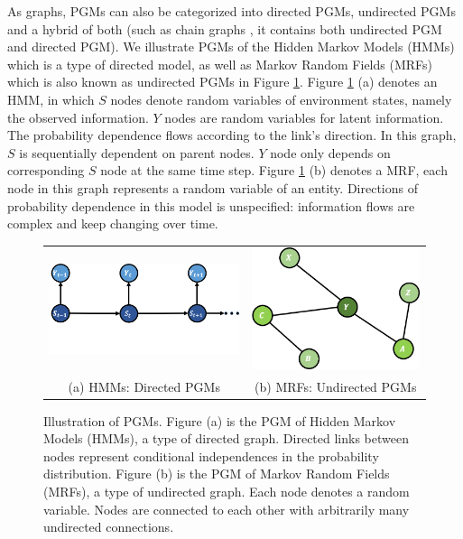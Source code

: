As graphs, PGMs can also be categorized into directed PGMs,
undirected PGMs and a hybrid of both (such as chain graphs
\cite{lauritzen1989graphical,frydenberg1990chain}, it contains
both undirected PGM and directed PGM). We illustrate PGMs of the
Hidden Markov Models \cite{eddy1996hidden} (HMMs) which is a type
of directed model, as well as Markov Random Fields
\cite{Hammersley:1971} (MRFs) which is also known as undirected
PGMs \cite{bishop:2006:PRML} in Figure \ref{fig:intro_hmm_mrf}.
Figure \ref{fig:intro_hmm_mrf} (a) denotes an HMM, in which $S$
nodes denote random variables of environment states, namely the
observed information. $Y$ nodes are random variables for latent
information. The probability dependence flows according to the
link's direction. In this graph, $S$ is sequentially dependent on
parent nodes. $Y$ node only depends on corresponding $S$ node at
the same time step. Figure \ref{fig:intro_hmm_mrf} (b) denotes a
MRF, each node in this graph represents a random variable of an
entity. Directions of probability dependence in this model is
unspecified: information flows are complex and keep changing over
time.
\begin{figure}[h]
  \centering
  \begin{tabular}{cc}
    \includegraphics[width=0.5\linewidth]{figures/HMM.png} &
                                                             \includegraphics[width=0.4\linewidth]{figures/MRF.png}\\
    {\small (a) HMMs: Directed PGMs}& {\small (b) MRFs: Undirected PGMs}\\
  \end{tabular}
  \caption{\label{fig:intro_hmm_mrf} Illustration of PGMs. Figure
    (a) is the PGM of Hidden Markov Models (HMMs), a type of
    directed graph. Directed links between nodes represent
    conditional independences in the probability distribution.
    Figure (b) is the PGM of Markov Random Fields (MRFs), a type
    of undirected graph. Each node denotes a random variable.
    Nodes are connected to each other with arbitrarily many
    undirected connections.}
\end{figure}

